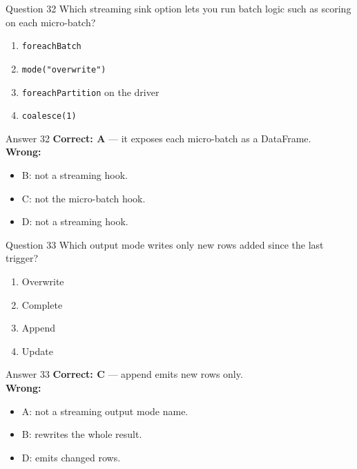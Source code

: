 \documentclass[aspectratio=169,11pt]{beamer}
\begin{document}
\begin{frame}{Question 32}
Which streaming sink option lets you run batch logic such as scoring on each micro-batch?
\begin{enumerate}[label=\Alph*.]
\item \texttt{foreachBatch}
\item \texttt{mode("overwrite")}
\item \texttt{foreachPartition} on the driver
\item \texttt{coalesce(1)}
\end{enumerate}
\end{frame}
\begin{frame}{Answer 32}
\textbf{Correct: A} --- it exposes each micro-batch as a DataFrame.\\
\vspace{0.5em}
\textbf{Wrong:}
\begin{itemize}
\item B: not a streaming hook.
\item C: not the micro-batch hook.
\item D: not a streaming hook.
\end{itemize}
\end{frame}

\begin{frame}{Question 33}
Which output mode writes only new rows added since the last trigger?
\begin{enumerate}[label=\Alph*.]
\item Overwrite
\item Complete
\item Append
\item Update
\end{enumerate}
\end{frame}
\begin{frame}{Answer 33}
\textbf{Correct: C} --- append emits new rows only.\\
\vspace{0.5em}
\textbf{Wrong:}
\begin{itemize}
\item A: not a streaming output mode name.
\item B: rewrites the whole result.
\item D: emits changed rows.
\end{itemize}
\end{frame}
\end{document}
